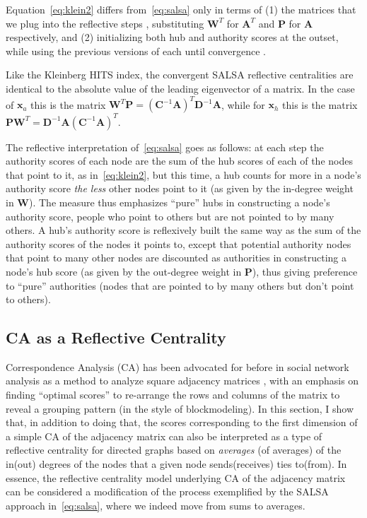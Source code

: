 \documentclass[a4paper,fleqn]{cas-sc}
\begin{document}
Equation~\ref{eq:klein2} differs from~\ref{eq:salsa} only in terms of (1) the matrices that we plug into the reflective steps \citep{lempel_moran01}, substituting  $\mathbf{W}^T$ for $\mathbf{A}^T$ and $\mathbf{P}$ for $\mathbf{A}$ respectively, and (2) initializing both hub and authority scores at the outset, while using the previous versions of each until convergence \citep[1186]{farahat_etal06}. 

Like the Kleinberg HITS index, the convergent SALSA reflective centralities are identical to the absolute value of the leading eigenvector of a matrix. In the case of $\mathbf{x}_a$ this is the matrix $\mathbf{W}^T\mathbf{P} = \left(\mathbf{C}^{-1}\mathbf{A}\right)^T\mathbf{D}^{-1}\mathbf{A}$, while for $\mathbf{x}_h$ this is the matrix $\mathbf{P}\mathbf{W}^T = \mathbf{D}^{-1}\mathbf{A}\left(\mathbf{C}^{-1}\mathbf{A}\right)^T$.

The reflective interpretation of~\ref{eq:salsa} goes as follows: at each step the authority scores of each node are the sum of the hub scores of each of the nodes that point to it, as in~\ref{eq:klein2}, but this time, a hub counts for more in a node's authority score \textit{the less} other nodes point to it (as given by the in-degree weight in $\mathbf{W}$). The measure thus emphasizes ``pure'' hubs in constructing a node's authority score, people who point to others but are not pointed to by many others. A hub's authority score is reflexively built the same way as the sum of the authority scores of the nodes it points to, except that potential authority nodes that point to many other nodes are discounted as authorities in constructing a node's hub score (as given by the out-degree weight in $\mathbf{P}$), thus giving preference to ``pure'' authorities (nodes that are pointed to by many others but don't point to others). 

\subsection{CA as a Reflective Centrality}
Correspondence Analysis (CA) has been advocated for before in social network analysis as a method to analyze square adjacency matrices \citep{noma_smith85}, with an emphasis on finding ``optimal scores'' to re-arrange the rows and columns of the matrix to reveal a grouping pattern (in the style of blockmodeling). In this section, I show that, in addition to doing that, the scores corresponding to the first dimension of a simple CA of the adjacency matrix can also be interpreted as a type of reflective centrality for directed graphs based on \textit{averages} (of averages) of the in(out) degrees of the nodes that a given node sends(receives) ties to(from). In essence, the reflective centrality model underlying CA of the adjacency matrix can be considered a modification of the process exemplified by the SALSA approach in~\ref{eq:salsa}, where we indeed move from sums to averages.
\end{document}
